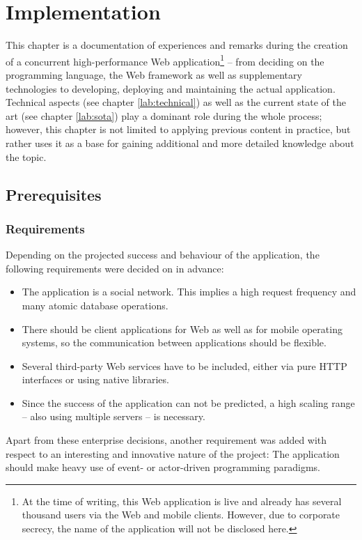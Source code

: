 \chapter{Implementation}
\label{sec:impl}
This chapter is a documentation of experiences and remarks during the creation of a concurrent high-performance Web application\footnote{At the time of writing, this Web application is live and already has several thousand users via the Web and mobile clients. However, due to corporate secrecy, the name of the application will not be disclosed here.} -- from deciding on the programming language, the Web framework as well as supplementary technologies to developing, deploying and maintaining the actual application. Technical aspects (see chapter \ref{lab:technical}) as well as the current state of the art (see chapter \ref{lab:sota}) play a dominant role during the whole process; however, this chapter is not limited to applying previous content in practice, but rather uses it as a base for gaining additional and more detailed knowledge about the topic.

\section{Prerequisites}
\label{sec:prerequitites}
\subsection{Requirements}
Depending on the projected success and behaviour of the application, the following requirements were decided on in advance:

\begin{itemize}
  \item{The application is a social network. This implies a high request frequency and many atomic database operations.}
  \item{There should be client applications for Web as well as for mobile operating systems, so the communication between applications should be flexible.}
  \item{Several third-party Web services have to be included, either via pure HTTP interfaces or using native libraries.}
  \item{Since the success of the application can not be predicted, a high scaling range -- also using multiple servers -- is necessary.}
\end{itemize}

Apart from these enterprise decisions, another requirement was added with respect to an interesting and innovative nature of the project: The application should make heavy use of event- or actor-driven programming paradigms.

